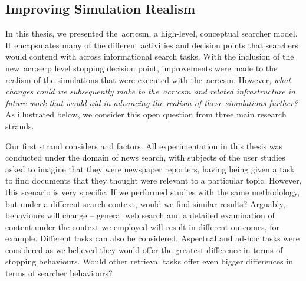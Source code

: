 \subsection{Improving Simulation Realism}\label{sec:conclusions:future:improving}
In this thesis, we presented the~\gls{acr:csm}, a high-level, conceptual searcher model. It encapsulates many of the different activities and decision points that searchers would contend with across informational search tasks. With the inclusion of the new~\gls{acr:serp} level stopping decision point, improvements were made to the realism of the simulations that were executed with the~\gls{acr:csm}. However, \emph{what changes could we subsequently make to the~\gls{acr:csm} and related infrastructure in future work that would aid in advancing the realism of these simulations further?} As illustrated below, we consider this open question from three main research strands.

\begin{figure}[h!]
    \centering
\end{figure}

Our first strand considers  and  factors. All experimentation in this thesis was conducted under the domain of news search, with subjects of the user studies asked to imagine that they were newspaper reporters, having being given a task to find documents that they thought were relevant to a particular topic. However, this scenario is very specific. If we performed studies with the same methodology, but under a different search context, would we find similar results? Arguably, behaviours will change -- general web search and a detailed examination of content under the context we employed will result in different outcomes, for example. Different tasks can also be considered. Aspectual and ad-hoc tasks were considered as we believed they would offer the greatest difference in terms of stopping behaviours. Would other retrieval tasks offer even bigger differences in terms of searcher behaviours?

